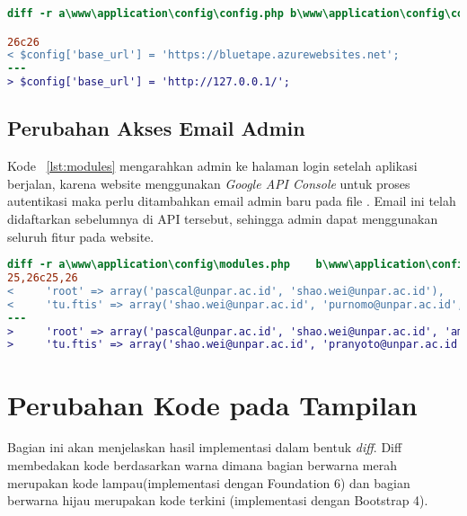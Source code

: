 \begin{lstlisting}[language=diff, caption=Perubahan file /config/config.php,  basicstyle=\ttfamily, frame=single,
columns=fullflexible, keepspaces=true, breaklines=true, label={lst:config}]
diff -r a\www\application\config\config.php b\www\application\config\config.php

26c26
< $config['base_url'] = 'https://bluetape.azurewebsites.net';
---
> $config['base_url'] = 'http://127.0.0.1/';
\end{lstlisting}

\subsection{Perubahan Akses Email Admin}

Kode ~\ref{lst:modules} mengarahkan admin ke halaman login setelah aplikasi berjalan, karena website menggunakan \textit{Google API Console} untuk proses autentikasi maka perlu ditambahkan email admin baru pada file . Email ini telah didaftarkan sebelumnya di API tersebut, sehingga admin dapat menggunakan seluruh fitur pada website. \\

\begin{lstlisting}[language=diff, caption=Perubahan file /config/modules.php,  basicstyle=\ttfamily, frame=single,
columns=fullflexible, keepspaces=true, breaklines=true, label={lst:modules}]
diff -r a\www\application\config\modules.php 	b\www\application\config\modules.php
25,26c25,26
<     'root' => array('pascal@unpar.ac.id', 'shao.wei@unpar.ac.id'),
<     'tu.ftis' => array('shao.wei@unpar.ac.id', 'purnomo@unpar.ac.id', 'walip@unpar.ac.id'),
---
>     'root' => array('pascal@unpar.ac.id', 'shao.wei@unpar.ac.id', 'amihapsahapsa@gmail.com'),
>     'tu.ftis' => array('shao.wei@unpar.ac.id', 'pranyoto@unpar.ac.id', 'walip@unpar.ac.id'),

\end{lstlisting}

\section{Perubahan Kode pada Tampilan}

Bagian ini akan menjelaskan hasil implementasi dalam bentuk \textit{diff}. Diff membedakan kode berdasarkan warna dimana bagian berwarna merah merupakan kode lampau(implementasi dengan Foundation 6) dan bagian berwarna hijau merupakan kode terkini  (implementasi dengan Bootstrap 4).
   
